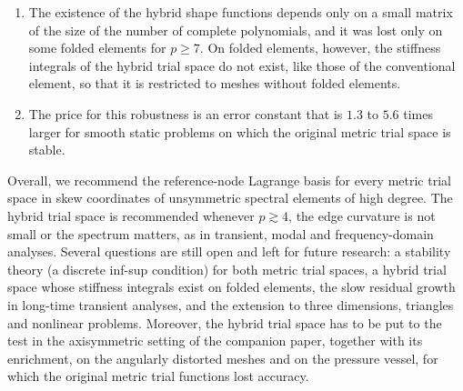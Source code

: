 \begin{enumerate}
  \item The existence of the hybrid shape functions depends only on a small matrix of the size of the number of complete polynomials, and it was lost only on some folded elements for $p\ge7$. On folded elements, however, the stiffness integrals of the hybrid trial space do not exist, like those of the conventional element, so that it is restricted to meshes without folded elements.
  \item The price for this robustness is an error constant that is $1.3$ to $5.6$ times larger for smooth static problems on which the original metric trial space is stable.
\end{enumerate}

Overall, we recommend the reference-node Lagrange basis for every metric trial space in skew coordinates of unsymmetric spectral elements of high degree. The hybrid trial space is recommended whenever $p\gtrsim4$, the edge curvature is not small or the spectrum matters, as in transient, modal and frequency-domain analyses. Several questions are still open and left for future research: a stability theory (a discrete inf-sup condition) for both metric trial spaces, a hybrid trial space whose stiffness integrals exist on folded elements, the slow residual growth in long-time transient analyses, and the extension to three dimensions, triangles and nonlinear problems. Moreover, the hybrid trial space has to be put to the test in the axisymmetric setting of the companion paper, together with its enrichment, on the angularly distorted meshes and on the pressure vessel, for which the original metric trial functions lost accuracy.


